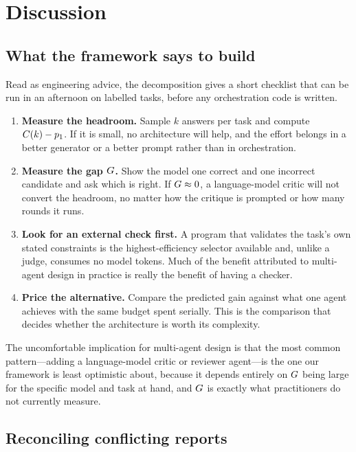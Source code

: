 \section{Discussion}
\label{sec:discussion}

\subsection{What the framework says to build}

Read as engineering advice, the decomposition gives a short checklist that can
be run in an afternoon on \nCalib{} labelled tasks, before any orchestration
code is written.

\begin{enumerate}[leftmargin=1.4em,itemsep=2pt,topsep=3pt]
\item \textbf{Measure the headroom.} Sample $k$ answers per task and compute
  $C(k)-p_1$. If it is small, no architecture will help, and the effort
  belongs in a better generator or a better prompt rather than in
  orchestration.
\item \textbf{Measure the gap $G$.} Show the model one correct and one
  incorrect candidate and ask which is right. If $G \approx 0$, a
  language-model critic will not convert the headroom, no matter how the
  critique is prompted or how many rounds it runs.
\item \textbf{Look for an external check first.} A program that validates the
  task's own stated constraints is the highest-efficiency selector available
  and, unlike a judge, consumes no model tokens. Much of the benefit attributed
  to multi-agent design in practice is really the benefit of having a checker.
\item \textbf{Price the alternative.} Compare the predicted gain against what
  one agent achieves with the same budget spent serially. This is the
  comparison that decides whether the architecture is worth its complexity.
\end{enumerate}

The uncomfortable implication for multi-agent design is that the most common
pattern---adding a language-model critic or reviewer agent---is the one our
framework is least optimistic about, because it depends entirely on $G$
being large for the specific model and task at hand, and $G$ is exactly what
practitioners do not currently measure.

\subsection{Reconciling conflicting reports}

